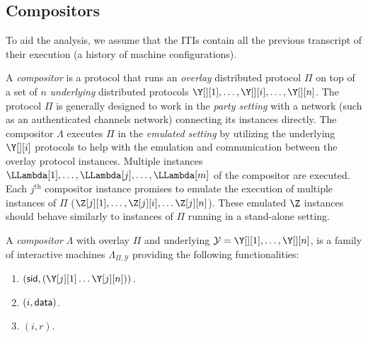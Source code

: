 \subsection{Compositors}

To aid the analysis, we assume that the ITIs contain all the previous transcript
of their execution (a history of machine configurations).

%


A \emph{compositor} is a protocol that
runs an \emph{overlay} distributed protocol $\Pi$ on top of a set of
$n$ \emph{underlying} distributed protocols $\Y[][1], \ldots,\allowbreak \Y[][i], \ldots, \Y[][n]$.
The protocol $\Pi$ is generally designed
to work in the \emph{party setting} with a network (such as an authenticated channels network)
connecting its instances directly.
The compositor $\Lambda$ executes
$\Pi$ in the \emph{emulated setting} by utilizing the underlying
$\Y[][i]$ protocols to help with the emulation and communication between the
overlay protocol instances.
Multiple instances $\LLambda[1], \ldots, \LLambda[j], \ldots, \LLambda[m]$
of the compositor are executed.
Each $j^\text{th}$ compositor instance promises to emulate the execution of multiple
instances of $\Pi$ ($\Z[j][1], \ldots, \Z[j][i], \allowbreak \ldots \Z[j][n]$).
These emulated $\Z$ instances should behave similarly to instances of $\Pi$
running in a stand-alone setting.

\begin{definition}[Compositor]
  A \emph{compositor} $\Lambda$ with overlay $\Pi$ and underlying $\mathcal{Y} = \Y[][1], \ldots, \Y[][n]$,
  is a family of interactive machines
  $\Lambda_{\Pi,\mathcal{Y}}$ providing the following
  functionalities:

  \begin{enumerate}
    \item \construct$(\sid, (\Y[j][1] \ldots \Y[j][n]))$.
    \item \writeToMachine$(i, \textsf{data})$.
    \item \emulationSnapshot$(i, r)$. %
  \end{enumerate}
\end{definition}

